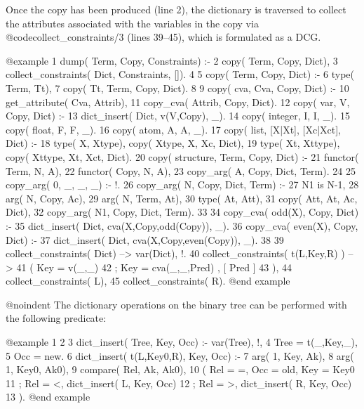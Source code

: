 Once the copy has been produced (line 2), the dictionary is traversed to
collect the attributes associated with the variables in the copy via
@code{collect_constraints/3} (lines 39--45), which is formulated as a DCG.

@example
     1	dump( Term, Copy, Constraints) :-
     2	  copy( Term, Copy, Dict),
     3	  collect_constraints( Dict, Constraints, []).
     4	
     5	copy( Term, Copy, Dict) :-
     6	  type( Term, Tt), 
     7	  copy( Tt, Term, Copy, Dict).
     8	
     9	copy( cva,       Cva,    Copy,     Dict) :- 
    10	  get_attribute( Cva, Attrib), 
    11	  copy_cva( Attrib, Copy, Dict).
    12	copy( var,       V,      Copy,     Dict) :- 
    13	  dict_insert( Dict, v(V,Copy), _).
    14	copy( integer,   I,      I,        _). 
    15	copy( float,     F,      F,        _).
    16	copy( atom,      A,      A,        _).
    17	copy( list,      [X|Xt], [Xc|Xct], Dict) :- 
    18	  type( X, Xtype),   copy( Xtype, X, Xc, Dict), 
    19	  type( Xt, Xttype), copy( Xttype, Xt, Xct, Dict).
    20	copy( structure, Term,   Copy,     Dict) :-
    21	  functor( Term, N, A),
    22	  functor( Copy, N, A),
    23	  copy_arg( A, Copy, Dict, Term).
    24	
    25	copy_arg( 0, _,    _,    _) :- !.
    26	copy_arg( N, Copy, Dict, Term) :- 
    27	  N1 is N-1, 
    28	  arg( N, Copy, Ac),
    29	  arg( N, Term, At),
    30	  type( At, Att), 
    31	  copy( Att, At, Ac, Dict),
    32	  copy_arg( N1, Copy, Dict, Term). 
    33	
    34	copy_cva( odd(X), Copy, Dict) :-
    35	  dict_insert( Dict, cva(X,Copy,odd(Copy)), _).  
    36	copy_cva( even(X), Copy, Dict) :-
    37	  dict_insert( Dict, cva(X,Copy,even(Copy)), _).
    38	
    39	collect_constraints( Dict)        --> {var(Dict)}, !.
    40	collect_constraints( t(L,Key,R) ) --> 
    41	  ( { Key = v(_,_) }
    42	  ; { Key = cva(_,_,Pred) }, [ Pred ]
    43	  ),
    44	  collect_constraints( L),
    45	  collect_constraints( R).
@end example

@noindent
The dictionary operations on the binary tree can be performed with
the following predicate:

@example
     1	%
     2	%
     3	dict_insert( Tree, Key, Occ) :- var(Tree), !,
     4	  Tree = t(_,Key,_), 
     5	  Occ = new.
     6	dict_insert( t(L,Key0,R), Key, Occ) :- 
     7	  arg( 1, Key, Ak),
     8	  arg( 1, Key0, Ak0),
     9	  compare( Rel, Ak, Ak0),
    10	  ( Rel = =, Occ = old, Key = Key0
    11	  ; Rel = <, dict_insert( L, Key, Occ)
    12	  ; Rel = >, dict_insert( R, Key, Occ)
    13	  ). 
@end example

